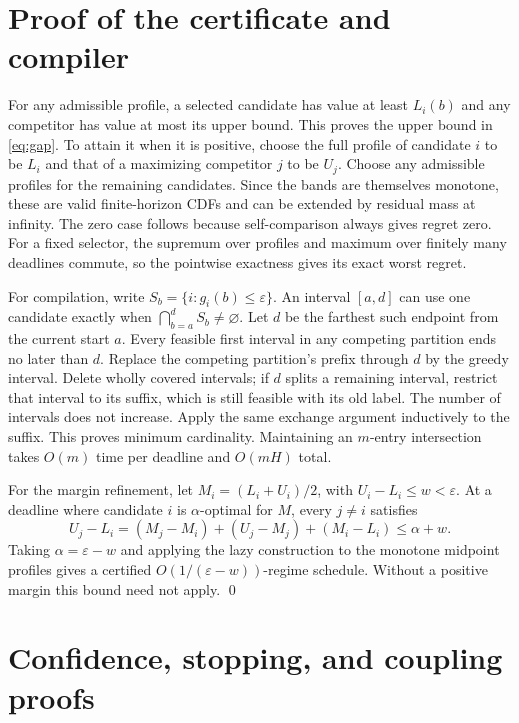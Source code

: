\documentclass[11pt]{article}
\theoremstyle{definition}\newtheorem{definition}[theorem]{Definition}
\newcommand{\eps}{\varepsilon}
\begin{document}
\section{Proof of the certificate and compiler}\label{app:compiler}
For any admissible profile, a selected candidate has value at least $L_i(b)$ and any competitor has value at most its upper bound. This proves the upper bound in \eqref{eq:gap}. To attain it when it is positive, choose the full profile of candidate $i$ to be $L_i$ and that of a maximizing competitor $j$ to be $U_j$. Choose any admissible profiles for the remaining candidates. Since the bands are themselves monotone, these are valid finite-horizon CDFs and can be extended by residual mass at infinity. The zero case follows because self-comparison always gives regret zero. For a fixed selector, the supremum over profiles and maximum over finitely many deadlines commute, so the pointwise exactness gives its exact worst regret.

For compilation, write $S_b=\{i:g_i(b)\le\eps\}$. An interval $[a,d]$ can use one candidate exactly when $\bigcap_{b=a}^dS_b\ne\varnothing$. Let $d$ be the farthest such endpoint from the current start $a$. Every feasible first interval in any competing partition ends no later than $d$. Replace the competing partition's prefix through $d$ by the greedy interval. Delete wholly covered intervals; if $d$ splits a remaining interval, restrict that interval to its suffix, which is still feasible with its old label. The number of intervals does not increase. Apply the same exchange argument inductively to the suffix. This proves minimum cardinality. Maintaining an $m$-entry intersection takes $O(m)$ time per deadline and $O(mH)$ total.

For the margin refinement, let $M_i=(L_i+U_i)/2$, with $U_i-L_i\le w<\eps$. At a deadline where candidate $i$ is $\alpha$-optimal for $M$, every $j\ne i$ satisfies
\[
 U_j-L_i=(M_j-M_i)+(U_j-M_j)+(M_i-L_i)\le\alpha+w.
\]
Taking $\alpha=\eps-w$ and applying the lazy construction to the monotone midpoint profiles gives a certified $O(1/(\eps-w))$-regime schedule. Without a positive margin this bound need not apply. \qed

\section{Confidence, stopping, and coupling proofs}
\end{document}
